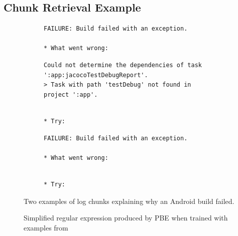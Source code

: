 \subsection{Chunk Retrieval Example}
\label{sec:crt-example}

\begin{figure}[tbp]
  \centering
\begin{subfigure}[tbp]{\columnwidth}
  \begin{lstlisting}[breaklines=true,frame=tlr]
FAILURE: Build failed with an exception.

* What went wrong:
  \end{lstlisting}
  \vspace{-\baselineskip}
  \begin{lstlisting}[backgroundcolor=\color{Cerulean!60},breaklines=true,frame=rl]
Could not determine the dependencies of task ':app:jacocoTestDebugReport'.
> Task with path 'testDebug' not found in project ':app'.
  \end{lstlisting}
  \vspace{-\baselineskip}
  \begin{lstlisting}[breaklines=true,frame=blr]

* Try:
  \end{lstlisting}
\end{subfigure}\hspace{\fill}
\begin{subfigure}[tbp]{\columnwidth}
  \centering
  \begin{lstlisting}[breaklines=true,frame=tlr]
FAILURE: Build failed with an exception.

* What went wrong:
  \end{lstlisting}
  \vspace{-\baselineskip}
  
  \vspace{-\baselineskip}
  \begin{lstlisting}[breaklines=true,frame=blr]

* Try:
  \end{lstlisting}
\end{subfigure}
  \caption{Two examples of log chunks explaining why an Android
  build failed.}
  \label{lst:chunk-example}
\end{figure}

\begin{figure}[tbp]
  \centering
  
  \caption{Simplified regular expression produced by PBE when trained
  with examples from }
  \label{lst:prose-program-simplified}
\end{figure}

